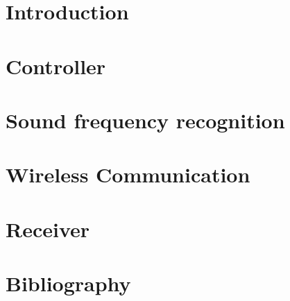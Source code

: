 \documentclass{article}
\begin{document}
	
	\newpage
	
	\tableofcontents
	\setcounter{page}{0}
	\newpage
	
	\section{Introduction}
	
	\newpage
	
	\section{Controller}
	
	\newpage
	
	\section{Sound frequency recognition}
	
	\newpage
	
	\section{Wireless Communication}
	
	\newpage
	
	\section{Receiver}
	
	\newpage
	
	\section{Bibliography}
	
	\newpage
	
	
\end{document}
